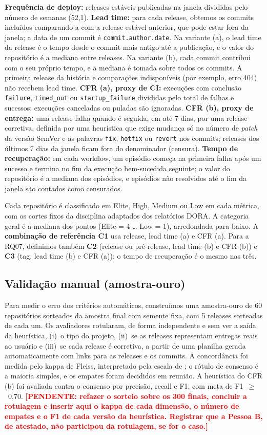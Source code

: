 \documentclass[12pt]{article}
\newcommand{\pendente}[1]{\textcolor{red}{\textbf{[PENDENTE: #1]}}}
\begin{document}
\textbf{Frequência de deploy:} releases estáveis publicadas na janela divididas pelo
número de semanas (52,1). \textbf{Lead time:} para cada release, obtemos os commits
incluídos comparando-a com a release estável anterior, que pode estar fora da janela;
a data de um commit é \texttt{commit.author.date}. Na variante (a), o lead time da
release é o tempo desde o commit mais antigo até a publicação, e o valor do
repositório é a mediana entre releases. Na variante (b), cada commit contribui com o
seu próprio tempo, e a mediana é tomada sobre todos os commits. A primeira release da
história e comparações indisponíveis (por exemplo, erro 404) não recebem lead time.
\textbf{CFR (a), proxy de CI:} execuções com conclusão \texttt{failure},
\texttt{timed\_out} ou \texttt{startup\_failure} divididas pelo total de falhas e
sucessos; execuções canceladas ou puladas são ignoradas. \textbf{CFR (b), proxy de
entrega:} uma release falha quando é seguida, em até 7 dias, por uma release
corretiva, definida por uma heurística que exige mudança só no número de
\textit{patch} da versão SemVer e as palavras \texttt{fix}, \texttt{hotfix} ou
\texttt{revert} nos commits; releases dos últimos 7 dias da janela ficam fora do
denominador (censura). \textbf{Tempo de recuperação:} em cada workflow, um episódio
começa na primeira falha após um sucesso e termina no fim da execução bem-sucedida
seguinte; o valor do repositório é a mediana dos episódios, e episódios não
resolvidos até o fim da janela são contados como censurados.

Cada repositório é classificado em Elite, High, Medium ou Low em cada métrica, com os
cortes fixos da disciplina adaptados dos relatórios DORA. A categoria geral é a
mediana dos pontos (Elite = 4 \ldots{} Low = 1), arredondada para baixo. A
\textbf{combinação de referência C1} usa release, lead time (a) e CFR (a). Para a
RQ07, definimos também \textbf{C2} (release ou pré-release, lead time (b) e CFR (b))
e \textbf{C3} (tag, lead time (b) e CFR (a)); o tempo de recuperação é o mesmo nas três.

\subsection{Validação manual (amostra-ouro)}

Para medir o erro dos critérios automáticos, construímos uma amostra-ouro de
60 repositórios sorteados da amostra final com semente fixa, com 5 releases sorteadas
de cada um. Os avaliadores rotularam, de forma independente e sem ver a saída da
heurística, (i)~o tipo do projeto, (ii)~se as releases representam entregas reais ao
usuário e (iii)~se cada release é corretiva, a partir de uma planilha gerada
automaticamente com links para as releases e os commits. A concordância foi medida
pelo kappa de Fleiss, interpretado pela escala de \cite{landis1977}; o rótulo de
consenso é a maioria simples, e os empates foram decididos em reunião. A heurística
do CFR (b) foi avaliada contra o consenso por precisão, recall e F1, com meta de
F1~$\geq$~0,70. \pendente{refazer o sorteio sobre os 300 finais, concluir a
rotulagem e inserir aqui o kappa de cada dimensão, o número de empates e o F1 de cada
versão da heurística. Registrar que a Pessoa B, de atestado, não participou da
rotulagem, se for o caso.}
\end{document}
